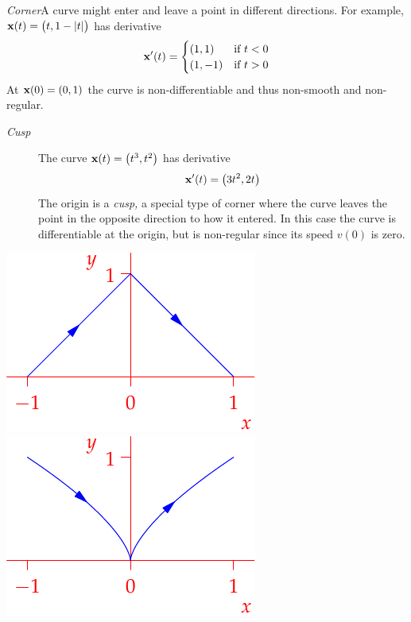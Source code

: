 \begin{examples}[lower separated=false, sidebyside, sidebyside align=top seam, sidebyside gap=0pt, righthand width=0.34\linewidth]{}{}
\hangindent\leftmargini
\emph{Corner}\lstsp A curve might enter and leave a point in different directions. For example, ${\mathbf{x}}(t)=\bigl(t,1-\left| t\right|\bigr)$ has derivative
\[{\mathbf{x}}'(t)=\begin{cases}
(1,1)&\text{if }t<0\\
(1,-1)&\text{if }t>0
\end{cases}\]
At ${\mathbf{x}}(0)=(0,1)$ the curve is non-differentiable and thus non-smooth and non-regular.
\begin{description}
	\item[\normalfont\emph{Cusp}] The curve ${\mathbf{x}}(t)=\bigl(t^3,t^2\bigr)$ has derivative 	\[{\mathbf{x}}'(t)= \left(3t^2,2t\right)\]
	The origin is a \emph{cusp,} a special type of corner where the curve leaves the point in the opposite direction to how it entered. In this case the curve is differentiable at the origin, but is non-regular since its speed $v(0)$ is zero.
\end{description}
\tcblower
\flushright\includegraphics{curves-corner}\\
\includegraphics{curves-cusp}
\end{examples}

\vfil

